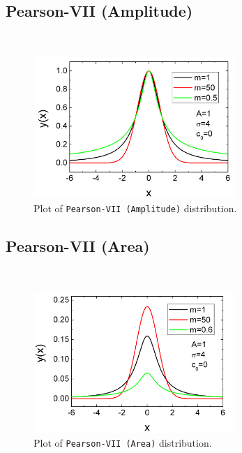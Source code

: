 \subsection{Pearson-VII (Amplitude)} ~\\
\label{sec:PearsonVIIAmplitude}
\begin{figure}[htb]
\begin{center}
\includegraphics[width=0.6824\textwidth]{PearsonVIIAmplitude.png}
\end{center}
\caption{Plot of \texttt{Pearson-VII (Amplitude)} distribution.}
\label{fig:PearsonVIIAmplitude}
\end{figure}

\clearpage
\subsection{Pearson-VII (Area)} ~\\
\label{sec:PearsonVIIArea}
\begin{figure}[htb]
\begin{center}
\includegraphics[width=0.6824\textwidth]{PearsonVIIArea.png}
\end{center}
\caption{Plot of \texttt{Pearson-VII (Area)} distribution.}
\label{fig:PearsonVIIArea}
\end{figure}

